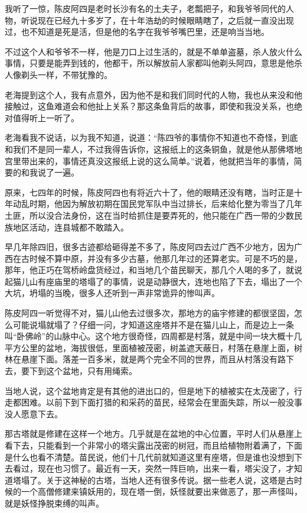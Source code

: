 我听了一惊，陈皮阿四是老时长沙有名的土夫子，老瓢把子，和我爷爷同代的人物，听说现在已经九十多岁了，在十年浩劫的时候眼睛瞎了，之后就一直没出现过，也不知道是死是活，但是他的名字在我爷爷嘴巴里，还是响当当地。

不过这个人和爷爷不一样，他是刀口上过生活的，就是不单单盗墓，杀人放火什么事情，只要是能弄到钱的，他都干，所以解放前人家都叫他剃头阿四，意思是他杀人像剃头一样，不带犹豫的。

老海提到这个人，我有点意外，因为他不是和我们同时代的人物，我也从来没和他接触过，这鱼难道会和他扯上关系？那这条鱼背后的故事，即使和我没关系，也绝对值得听上一听了。

老海看我不说话，以为我不知道，说道：“陈四爷的事情你不知道也不奇怪，到底和我们不是同一辈人，不过我得告诉你，这报纸上的这条铜鱼，就是他从那佛塔地宫里带出来的，事情还真没这报纸上说的这么简单。”说着，他就把当年的事情，简要的和我说了一遍。

原来，七四年的时候，陈皮阿四也有将近六十了，他的眼睛还没有瞎，当时正是十年动乱时期，他因为解放初期在国民党军队中当过排长，后来给化整为零当了几年土匪，所以没合法身份，这在当时给抓住是要弄死的，他只能在广西一带的少数民族地区活动，连县城都不敢踏入。

早几年除四旧，很多古迹都给砸得差不多了，陈皮阿四去过广西不少地方，因为广西在古时候不算中原，并没有多少古墓，他那几年过的还算老实。可是不巧的是，那年，他正巧在驾桥岭盘货经过，和当地几个苗民聊天，那几个人喝的多了，就说起猫儿山有座庙里的塔塌了的事情，说是动静很大，连地也陷了下去，塌出了一个大坑，坍塌的当晚，很多人还听到一声非常诡异的惨叫声。

陈皮阿四一听觉得不对，猫儿山他去过很多次，那地方的庙宇修建的都很坚固，怎么可能说塌就塌了？仔细一问，才知道这座塔并不是在猫儿山上，而是边上一条叫“卧佛岭”的山脉中心。这个地方很奇怪，四周都是村落，就是中间一块大概十几平方公里的盆地，海拔很低，里面植被茂密，树盖遮天蔽日，村落在悬崖上面，树林在悬崖下面。落差一百多米，就是两个完全不同的世界，而且从村落没有路下去，要下到这个盆地，只有用绳索。

当地人说，这个盆地肯定是有其他的进出口的，但是地下的植被实在太茂密了，行走都困难。以前下到下面打猎的和采药的苗民，经常会在里面失踪，所以一般没事没人愿意下去。

那古塔就是修建在这样一个地方。几乎就是在盆地的中心位置，平时人们从悬崖上看下去，只能看到一个非常小的塔尖露出茂密的树冠，而且给植物附着满了，下面是什么也看不清楚。苗民说，他们十几代前就知道这里有座塔，但是谁也没想到下去看过，现在也习惯了。最近有一天，突然一阵巨响，出来一看，塔尖没了，才知道塔塌了。关于这神秘的古塔，当地人还有很多传说。据一些老人说，这塔是古时候的一个高僧修建来镇妖用的，现在塔一倒，妖怪就要出来做恶了，那一声怪叫，就是妖怪挣脱束缚的叫声。

